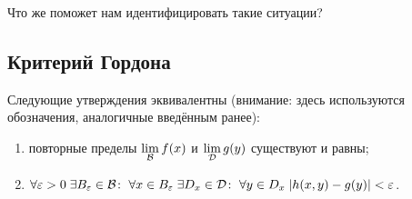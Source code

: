 \documentclass[a4paper, 12pt]{article}
\begin{document}
Что же поможет нам идентифицировать такие ситуации?

\subsection{Критерий Гордона}

\begin{Theorem}
    Следующие утверждения эквивалентны (внимание: здесь используются обозначения, аналогичные введённым ранее):
    \begin{enumerate}
        \item повторные пределы $\lim\limits_{\mathcal{B}}f(x)$ и $\lim\limits_{\mathcal{D}} g(y)$ существуют и равны;
        \item $\forall \varepsilon>0\; \exists B_\varepsilon \in \mathcal{B}\colon\; \forall x\in B_\varepsilon\; \exists D_x\in\mathcal{D}\colon \; \forall y \in D_x\; |h(x,y) -g(y)|<\varepsilon$.
    \end{enumerate}
\end{Theorem}
\end{document}
